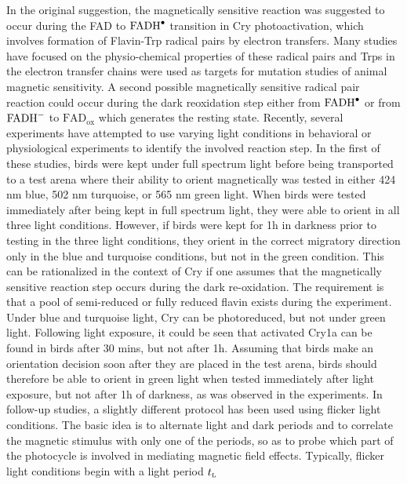 \documentclass[twoside,twocolumn,9pt]{article}
\begin{document}
In the original suggestion, \cite{Ritz2000} the magnetically sensitive reaction was suggested to occur during the FAD to 
$\ce{FADH^{.}}$ transition in Cry photoactivation, which involves formation of Flavin-Trp radical pairs by electron transfers. Many 
studies have focused on the physio-chemical properties of these radical pairs \cite{Atkins2019, Solovyov2007, Biskup2009, 
Sheppard2017} and Trps in the electron transfer chains were used as targets for mutation studies of animal magnetic 
sensitivity. \cite{Gegear2010, Fedele2014} A second possible magnetically sensitive radical pair reaction could occur during the 
dark reoxidation step either from $\ce{FADH^{.}}$ or from $\ce{FADH^{-}}$ to $\text{FAD}_{\text{ox}}$ which generates the resting 
state. \cite{Ritz2009} Recently, several experiments have attempted to use varying light conditions in behavioral or physiological 
experiments to identify the involved reaction step. In the first of these studies, birds were kept under full spectrum light before 
being transported to a test arena where their ability to orient magnetically was tested in either 424 nm blue, 502 nm turquoise, or 
565 nm green light. \cite{Wiltschko2014} When birds were tested immediately after being kept in full spectrum light, they were able 
to orient in all three light conditions. However, if birds were kept for 1h in darkness prior to testing in the three light 
conditions, they orient in the correct migratory direction only in the blue and turquoise conditions, but not in the green 
condition. This can be rationalized in the context of Cry if one assumes that the magnetically sensitive reaction step occurs 
during the dark re-oxidation. The requirement is that a pool of semi-reduced or fully reduced flavin exists during the experiment. 
Under blue and turquoise light, Cry can be photoreduced, but not under green light. Following light exposure, it could be seen that 
activated Cry1a can be found in birds after 30 mins, but not after 1h. \cite{Niessner2013, Niessner2014} Assuming that birds make 
an orientation decision soon after they are placed in the test arena, birds should therefore be able to orient in green light when 
tested immediately after light exposure, but not after 1h of darkness, as was observed in the experiments. \cite{Wiltschko2014} In 
follow-up studies, a slightly different protocol has been used using flicker light conditions. The basic idea is to alternate light 
and dark periods and to correlate the magnetic stimulus with only one of the periods, so as to probe which part of the photocycle 
is involved in mediating magnetic field effects. Typically, flicker light conditions begin with a light period $t_{\textsc{l}}$ 
\end{document}
